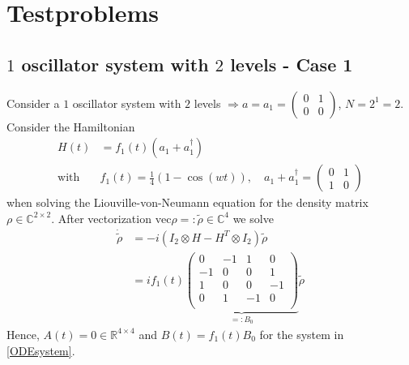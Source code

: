 \documentclass[12pt]{article}
\begin{document}
\section{Testproblems}

\subsection{$1$ oscillator system with $2$ levels - Case 1}
Consider a $1$ oscillator system with $2$ levels $\Rightarrow a = a_1 = \begin{pmatrix} 0 & 1 \\ 0 & 0 \end{pmatrix}$, $N=2^1 = 2$.
Consider the Hamiltonian 
\begin{align*}
H(t) &= f_1(t) (a_1 + a_1^{\dagger})\\ 
\text{with} \quad &f_1(t) = \frac 14(1-\cos(wt)), \quad a_1 + a_1^{\dagger} = \begin{pmatrix} 0 & 1 \\ 1 & 0 \end{pmatrix}
\end{align*}
when solving the Liouville-von-Neumann equation for the density matrix $\rho \in \mathds{C}^{2\times 2}$. After vectorization $\text{vec} \rho =: \tilde \rho \in \mathds{C}^4$ we solve
\begin{align*}
   \dot{\tilde\rho} & = -i(I_2 \otimes H - H^T \otimes I_2) \tilde\rho \\
                     &= if_1(t) 
                  \underbrace{\begin{pmatrix}
                  0 & -1 & 1 & 0 \\
                 -1 &  0 & 0 & 1 \\
                  1 &  0 & 0 & -1\\
                  0 &  1 & -1& 0 \\
                  \end{pmatrix}}_{=: B_0} \tilde \rho
\end{align*}
 Hence, $A(t) = 0  \in \mathds{R}^{4\times 4}$ and $B(t) = f_1(t) B_0$ for the system in \eqref{ODEsystem}.
\end{document}
